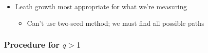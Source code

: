 \documentclass[11pt]{article}
\begin{document}
\begin{itemize}
\begin{itemize}
\end{itemize} %

\item Leath growth most appropriate for what we're measuring\\
\label{sec-4.2.2.3}

\begin{itemize}

\item Can't use two-seed method; we must find all possible paths\\
\label{sec-4.2.2.3.1}

\end{itemize} %
\end{itemize} %
\subsubsection{Procedure for $q>1$}
\label{sec-4.2.3}
\end{document}
